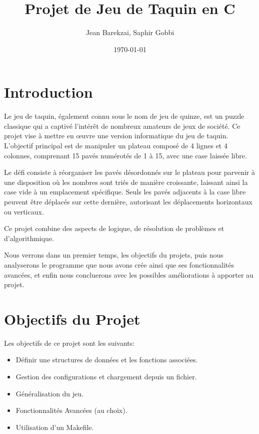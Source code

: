 \documentclass{article}
\title{Projet de Jeu de Taquin en C}
\author{Jean Barekzai, Saphir Gobbi}
\date{\today}
\begin{document}
\maketitle

\tableofcontents

\newpage


\section{Introduction}

Le jeu de taquin, également connu sous le nom de jeu de quinze, est un puzzle classique qui a captivé l'intérêt de nombreux amateurs de jeux de société. Ce projet vise à mettre en œuvre une version informatique du jeu de taquin. L'objectif principal est de manipuler un plateau composé de 4 lignes et 4 colonnes, comprenant 15 pavés numérotés de 1 à 15, avec une case laissée libre.

Le défi consiste à réorganiser les pavés désordonnés sur le plateau pour parvenir à une disposition où les nombres sont triés de manière croissante, laissant ainsi la case vide à un emplacement spécifique. Seuls les pavés adjacents à la case libre peuvent être déplacés sur cette dernière, autorisant les déplacements horizontaux ou verticaux.

Ce projet combine des aspects de logique, de résolution de problèmes et d'algorithmique.

Nous verrons dans un premier temps, les objectifs du projets, puis nous analyserons le programme que nous avons crée ainsi que ses fonctionnalités avancées, et enfin nous concluerons avec les possibles améliorations à apporter au projet. 

\section{Objectifs du Projet}

Les objectifs de ce projet sont les suivants:
\begin{itemize}
\item Définir une structures de données et les fonctions associées.
\item Gestion des configurations et chargement depuis un fichier.
\item Généralisation du jeu.
\item Fonctionnalités Avancées (au choix).
\item Utilisation d'un Makefile.
\end{itemize}
\end{document}
